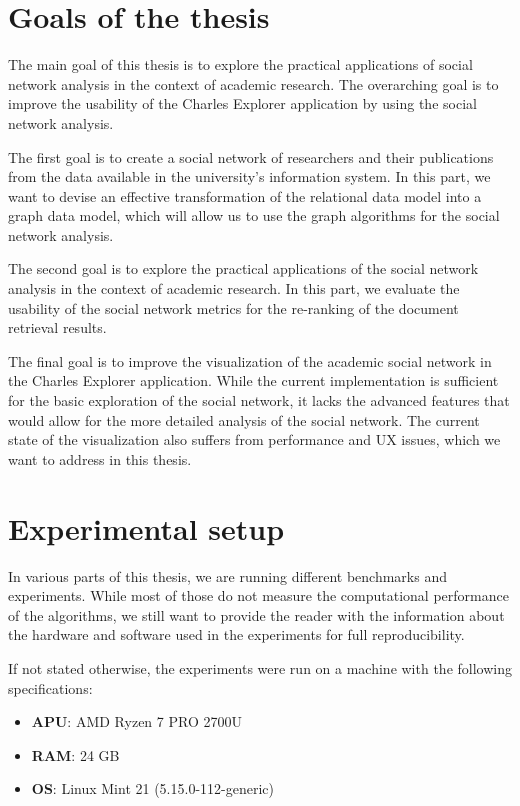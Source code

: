 \section*{Goals of the thesis}

The main goal of this thesis is to explore the practical applications of social network analysis 
in the context of academic research. The overarching goal is to improve the usability
of the Charles Explorer application by using the social network analysis.

The first goal is to create a social network of researchers and their publications from the data available in the university's information system.
In this part, we want to devise an effective transformation of the relational data model into a graph data model, 
which will allow us to use the graph algorithms for the social network analysis.

The second goal is to explore the practical applications of the social network analysis in the context of academic research.
In this part, we evaluate the usability of the social network metrics for the re-ranking of the document retrieval results.

The final goal is to improve the visualization of the academic social network in the Charles Explorer application.
While the current implementation is sufficient for the basic exploration of the social network, 
it lacks the advanced features that would allow for the more detailed analysis of the social network.
The current state of the visualization also suffers from performance and UX issues, which we want to address in this thesis.

\section*{Experimental setup}

In various parts of this thesis, we are running different benchmarks and experiments.
While most of those do not measure the computational performance of the algorithms, we still want to 
provide the reader with the information about the hardware and software used in the experiments for full reproducibility.

If not stated otherwise, the experiments were run on a machine with the following specifications:
\begin{itemize}
    \item \textbf{APU}: AMD Ryzen 7 PRO 2700U
    \item \textbf{RAM}: 24 GB
    \item \textbf{OS}: Linux Mint 21 (5.15.0-112-generic)
\end{itemize}

